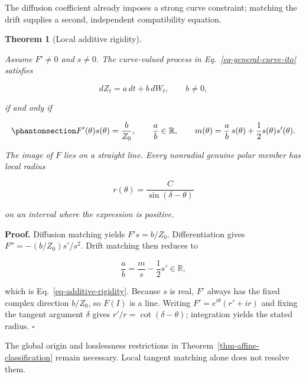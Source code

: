 \documentclass[
  english,
  10pt,
  letterpaper,
  DIV=11,
  numbers=noendperiod]{scrartcl}
\theoremstyle{definition}
\theoremstyle{plain}
\newtheorem{theorem}{Theorem}[section]
\theoremstyle{plain}
\theoremstyle{remark}
\begin{document}
The diffusion coefficient already imposes a strong curve constraint;
matching the drift supplies a second, independent compatibility
equation.

\begin{theorem}[Local additive
rigidity]\protect\hypertarget{thm-additive-rigidity}{}\label{thm-additive-rigidity}

Assume \(F'\ne0\) and \(s\ne0\). The curve-valued process in
Eq.~\ref{eq-general-curve-ito} satisfies

\[
dZ_t=a\,dt+b\,dW_t,\qquad b\ne0,
\]

if and only if

\begin{equation}\protect\phantomsection\label{eq-additive-rigidity}{
F'(\theta)s(\theta)=\frac b{Z_0},
\qquad
\frac ab\in\mathbb R,
\qquad
m(\theta)=\frac ab\,s(\theta)+\frac12s(\theta)s'(\theta).
}\end{equation}

The image of \(F\) lies on a straight line. Every nonradial genuine
polar member has local radius

\[
r(\theta)=\frac{C}{\sin(\delta-\theta)}
\]

on an interval where the expression is positive.

\end{theorem}

\textbf{Proof.} Diffusion matching yields \(F's=b/Z_0\). Differentiation
gives \(F''=-(b/Z_0)s'/s^2\). Drift matching then reduces to

\[
\frac ab=\frac ms-\frac12s'\in\mathbb R,
\]

which is Eq.~\ref{eq-additive-rigidity}. Because \(s\) is real, \(F'\)
always has the fixed complex direction \(b/Z_0\), so \(F(I)\) is a line.
Writing \(F'=e^{i\theta}(r'+ir)\) and fixing the tangent argument
\(\delta\) gives \(r'/r=\cot(\delta-\theta)\); integration yields the
stated radius. \(\square\)

The global origin and losslessness restrictions in
Theorem~\ref{thm-affine-classification} remain necessary. Local tangent
matching alone does not resolve them.
\end{document}
